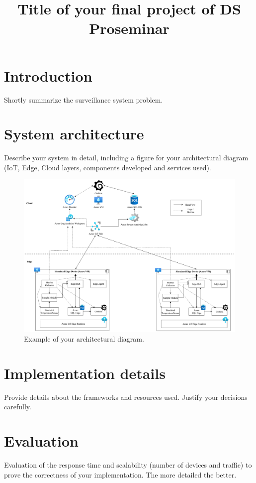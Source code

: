 \documentclass[conference]{IEEEtran}
\begin{document}
\title{Title of your final project of DS Proseminar}

\author{
\and
{}
\and
{}
\and
{}
}

\maketitle

\section{Introduction}
Shortly summarize the surveillance system problem.  

\section{System architecture}
Describe your system in detail, including a figure for your architectural diagram (IoT, Edge, Cloud layers, components developed and services used).

\begin{figure}[h!]
    \centering
    \includegraphics[width=1\linewidth]{image.png}
    \caption{Example of your architectural diagram.}
    \label{fig:enter-label}
\end{figure}

\section{Implementation details}
Provide details about the frameworks and resources used. Justify your decisions carefully.

\section{Evaluation}
Evaluation of the response time and scalability (number of devices and traffic) to prove the correctness of your implementation. The more detailed the better. 
\end{document}
